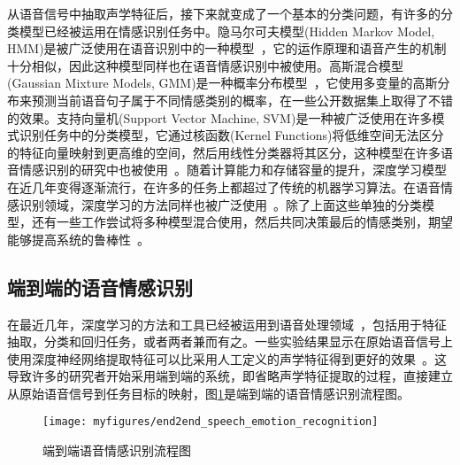 从语音信号中抽取声学特征后，接下来就变成了一个基本的分类问题，有许多的分类模型已经被运用在情感识别任务中。隐马尔可夫模型(Hidden Markov Model, HMM)是被广泛使用在语音识别中的一种模型~\cite{Rabiner2007An, Ephraim2002Hidden, Schuller2003Hidden, Nogueiras2012Speech, Kwon2003Emotion, Lee2004Emotion}，它的运作原理和语音产生的机制十分相似，因此这种模型同样也在语音情感识别中被使用。高斯混合模型(Gaussian Mixture Models, GMM)是一种概率分布模型~\cite{Vlassis2002A, Reynolds1995Robust, Rissanen1978Modeling, El2004On, Vlassis1999A, Breazeal2002Recognition, Slaney2003Baby}，它使用多变量的高斯分布来预测当前语音句子属于不同情感类别的概率，在一些公开数据集上取得了不错的效果。支持向量机(Support Vector Machine, SVM)是一种被广泛使用在许多模式识别任务中的分类模型，它通过核函数(Kernel Functions)将低维空间无法区分的特征向量映射到更高维的空间，然后用线性分类器将其区分，这种模型在许多语音情感识别的研究中也被使用~\cite{Burges2008A, Schuller2004Speech, Pierre2003The}。随着计算能力和存储容量的提升，深度学习模型在近几年变得逐渐流行，在许多的任务上都超过了传统的机器学习算法。在语音情感识别领域，深度学习的方法同样也被广泛使用~\cite{Carpenter1989Neural, Nicholson2000Emotion, Crystal1978Linear, Hozjan2003Context, Petrushin2000EMOTION}。除了上面这些单独的分类模型，还有一些工作尝试将多种模型混合使用，然后共同决策最后的情感类别，期望能够提高系统的鲁棒性~\cite{Schuller2005Robust, Kuncheva2004Combining, Lugger2015Combining, Mashao2006Combining, Wu2005Linear, Kuncheva2002A}。

\subsection{端到端的语音情感识别}
\label{ssec:end2end_emo_rec}
在最近几年，深度学习的方法和工具已经被运用到语音处理领域~\cite{Han2014Speech, Lee2015High, Huang2014Speech, Le2013Emotion, Rana2016Emotion, Chernykh2017Emotion}，包括用于特征抽取，分类和回归任务，或者两者兼而有之。一些实验结果显示在原始语音信号上使用深度神经网络提取特征可以比采用人工定义的声学特征得到更好的效果~\cite{Trigeorgis2016Adieu}。这导致许多的研究者开始采用端到端的系统，即省略声学特征提取的过程，直接建立从原始语音信号到任务目标的映射，图\ref{fig:end2end_speech_emotion_recognition}是端到端的语音情感识别流程图。

\begin{figure}[htb] %
    \centering
    \vspace{-0.8cm}  %
    \setlength{\belowcaptionskip}{0cm}   %
    \texttt{[image: myfigures/end2end\_speech\_emotion\_recognition]}
    \caption{端到端语音情感识别流程图}
    \label{fig:end2end_speech_emotion_recognition}
\end{figure}

